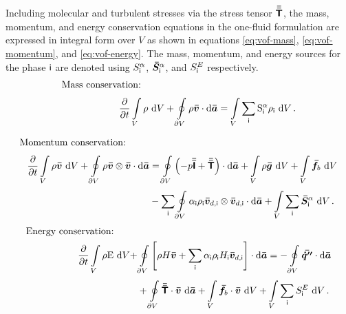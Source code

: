 Including molecular and turbulent stresses via the stress tensor \({\bm{\bar{\bar{\mathsf{T}}}}}\), the 
mass, momentum, and energy conservation equations in the one-fluid formulation are expressed in 
integral form over \(V\) as shown in equations \eqref{eq:vof-mass}, \eqref{eq:vof-momentum}, 
and \eqref{eq:vof-energy}. The mass, momentum, and energy sources for the phase \(\mathsf {i}\) 
 are denoted using \(S_{\mathsf {i}}^{\alpha}\), \(\bm{\bar{S}}_{\mathsf {i}}^{\alpha}\), and
 \(S_{\mathsf {i}}^{E}\) respectively.
\begin{equation}\label{eq:vof-mass}
\begin{split}
\text{Mass conservation: }\qquad&\\  \displaystyle\frac{\partial{}}{\partial{t}}\displaystyle\int\limits_{V}^{} \rho\,\mathop{}\!\mathrm{d}{V} &+
\displaystyle\oint\limits_{\partial V}^{} \rho \bm{\bar{v}} \cdot \mathop{}\!\mathrm{d}{\bm{\bar{a}}}
 =  \displaystyle\int\limits_{V}^{} \sum_{\mathsf {i}}\mathrm{S}^{\alpha}_{\mathsf {i}} \rho_{\mathsf {i}}\,\mathop{}\!\mathrm{d}{V}\,.
\end{split}
\end{equation}

\begin{equation}\label{eq:vof-momentum}
\begin{split}
\text{Momentum conservation: }\qquad&\\   
\displaystyle\frac{\partial{}}{\partial{t}}\displaystyle\int\limits_{V}^{} \rho \bm{\bar{v}}\,\mathop{}\!\mathrm{d}{V} +
\displaystyle\oint\limits_{\partial V}^{} \rho\bm{\bar{v}} \otimes \bm{\bar{v}} \cdot \mathop{}\!\mathrm{d}{\bm{\bar{a}}}
&= \displaystyle\oint\limits_{\partial V}^{} \left(-p {\bm{\bar{\bar{\mathsf{I}}}}} + {\bm{\bar{\bar{\mathsf{T}}}}}\right)\cdot\mathop{}\!\mathrm{d}{\bm{\bar{a}}} 
+ \displaystyle\int\limits_{V}^{} \rho \bm{\bar{g}}\,\mathop{}\!\mathrm{d}{V}
+ \displaystyle\int\limits_{V}^{} \bm{\bar{f}}_{b}\,\mathop{}\!\mathrm{d}{V}\\
&- \sum_{\mathsf {i}}\displaystyle\oint\limits_{\partial V}^{} \alpha_{\mathsf {i}} \rho_{\mathsf {i}} \bm{\bar{v}}_{d,\mathsf {i}} \otimes \bm{\bar{v}}_{d,\mathsf {i}} \cdot\mathop{}\!\mathrm{d}{\bm{\bar{a}}}
+ \displaystyle\int\limits_{V}^{} \sum_{\mathsf {i}}\bm{\bar{S}}^{\alpha}_{\mathsf {i}}\,\mathop{}\!\mathrm{d}{V}\,.
\end{split}
\end{equation}
\begin{equation}\label{eq:vof-energy}
\begin{split}
\text{Energy conservation: }\qquad&\\  
\displaystyle\frac{\partial{}}{\partial{t}}\displaystyle\int\limits_{V}^{}\rho \mathrm{E}\,\mathop{}\!\mathrm{d}{V} +&
\displaystyle\oint\limits_{\partial V}^{} \left[\rho H \bm{\bar{v}} +  \sum_{\mathsf {i}}\alpha_{\mathsf {i}} \rho_{\mathsf {i}} H_{\mathsf {i}} \bm{\bar{v}}_{d,\mathsf {i}}\right] \cdot \mathop{}\!\mathrm{d}{\bm{\bar{a}}}
 =  - \displaystyle\oint\limits_{\partial V}^{} \bm{\bar{\dot{q}''}}  \cdot \mathop{}\!\mathrm{d}{\bm{\bar{a}}}\\  &+ \displaystyle\oint\limits_{\partial V}^{} {\bm{\bar{\bar{\mathsf{T}}}}}\cdot\bm{\bar{v}}\,\mathop{}\!\mathrm{d}{\bm{\bar{a}}} 
+ \displaystyle\int\limits_{V}^{}\bm{\bar{f}}_{b}\cdot\bm{\bar{v}}\,\mathop{}\!\mathrm{d}{V}
+ \displaystyle\int\limits_{V}^{} \sum_{\mathsf {i}} S_{\mathsf {i}}^{E}\,\mathop{}\!\mathrm{d}{V}\,.
\end{split}
\end{equation}


